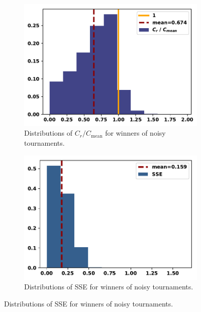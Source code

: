 \documentclass{article}
\begin{document}
\begin{figure}[!htbp]
    \centering
    \begin{subfigure}{0.35\textwidth}
        \centering
        \includegraphics[width=\textwidth]{../images/compared_to_mean_noisy.pdf}
        \caption{Distributions of \(C_r / C_{\text{mean}}\) for winners of noisy tournaments.}
    \end{subfigure}
    \begin{subfigure}{0.35\textwidth}
        \centering
        \includegraphics[width=\textwidth]{../images/sse_noisy.pdf}
        \caption{Distributions of SSE for winners of noisy tournaments.}
    \end{subfigure}
\end{figure}
\end{document}

